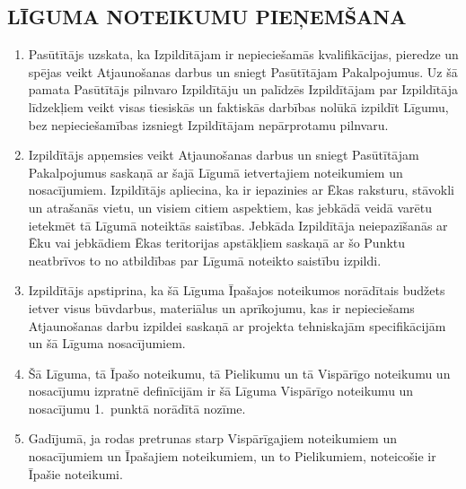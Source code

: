 \begin{multicols}{2}
\subsection{LĪGUMA NOTEIKUMU PIEŅEMŠANA}
\begin{enumerate}
	\item Pasūtītājs uzskata, ka Izpildītājam ir nepieciešamās kvalifikācijas, pieredze un spējas veikt Atjaunošanas darbus un sniegt Pasūtītājam Pakalpojumus. Uz šā pamata Pasūtītājs pilnvaro Izpildītāju un palīdzēs Izpildītājam par Izpildītāja līdzekļiem veikt visas tiesiskās un faktiskās darbības nolūkā izpildīt Līgumu, bez nepieciešamības izsniegt Izpildītājam nepārprotamu pilnvaru.
	\item Izpildītājs apņemsies veikt Atjaunošanas darbus un sniegt Pasūtītājam Pakalpojumus saskaņā ar šajā Līgumā ietvertajiem noteikumiem un nosacījumiem. Izpildītājs apliecina, ka ir iepazinies ar Ēkas raksturu, stāvokli un atrašanās vietu, un visiem citiem aspektiem, kas jebkādā veidā varētu ietekmēt tā Līgumā noteiktās saistības. Jebkāda Izpildītāja neiepazīšanās ar Ēku vai jebkādiem Ēkas teritorijas apstākļiem saskaņā ar šo Punktu neatbrīvos to no atbildības par Līgumā noteikto saistību izpildi.
	\item Izpildītājs apstiprina, ka šā Līguma Īpašajos noteikumos norādītais budžets ietver visus būvdarbus, materiālus un aprīkojumu, kas ir nepieciešams Atjaunošanas darbu izpildei saskaņā ar projekta tehniskajām specifikācijām un šā Līguma nosacījumiem.
	\item Šā Līguma, tā Īpašo noteikumu, tā Pielikumu un tā Vispārīgo noteikumu un nosacījumu izpratnē definīcijām ir šā Līguma Vispārīgo noteikumu un nosacījumu 1.\ punktā norādītā nozīme.
	\item Gadījumā, ja rodas pretrunas starp Vispārīgajiem noteikumiem un nosacījumiem un Īpašajiem noteikumiem, un to Pielikumiem, noteicošie ir Īpašie noteikumi.
\end{enumerate}


\end{multicols}
